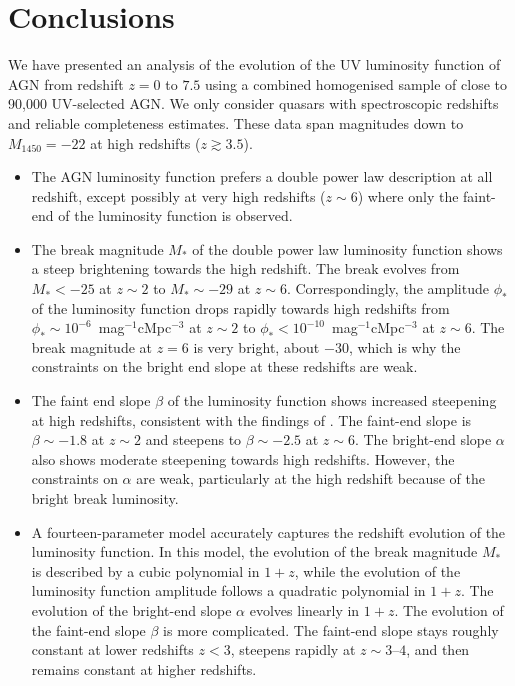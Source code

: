 \documentclass[a4paper,fleqn,usenatbib]{mnras}
\begin{document}
\section{Conclusions}

We have presented an analysis of the evolution of the UV luminosity
function of AGN from redshift $z=0$ to $7.5$ using a combined
homogenised sample of close to 90,000 UV-selected AGN.  We only
consider quasars with spectroscopic redshifts and reliable
completeness estimates.  These data span magnitudes down to
$M_{1450}=-22$ at high redshifts ($z\gtrsim 3.5$).

\begin{itemize}
\item The AGN luminosity function prefers a double power law
  description at all redshift, except possibly at very high redshifts
  ($z\sim 6$) where only the faint-end of the luminosity function is
  observed.

\item The break magnitude $M_*$ of the double power law luminosity
  function shows a steep brightening towards the high redshift.  The
  break evolves from $M_*<-25$ at $z\sim 2$ to $M_*\sim -29$ at $z\sim
  6$.  Correspondingly, the amplitude $\phi_*$ of the luminosity
  function drops rapidly towards high redshifts from $\phi_*\sim
  10^{-6}$~mag$^{-1}$cMpc$^{-3}$ at $z\sim 2$ to $\phi_*<
  10^{-10}$~mag$^{-1}$cMpc$^{-3}$ at $z\sim 6$.  The break magnitude
  at $z=6$ is very bright, about $-30$, which is why the constraints
  on the bright end slope at these redshifts are weak.

\item The faint end slope $\beta$ of the luminosity function shows
  increased steepening at high redshifts, consistent with the findings
  of \citep{2015AA...578A..83G}.  The faint-end slope is $\beta\sim
  -1.8$ at $z\sim 2$ and steepens to $\beta\sim-2.5$ at $z\sim 6$.
  The bright-end slope $\alpha$ also shows moderate steepening towards
  high redshifts.  However, the constraints on $\alpha$ are weak,
  particularly at the high redshift because of the bright break
  luminosity.

\item A fourteen-parameter model accurately captures the redshift
  evolution of the luminosity function.  In this model, the evolution
  of the break magnitude $M_*$ is described by a cubic polynomial in
  $1+z$, while the evolution of the luminosity function amplitude
  follows a quadratic polynomial in $1+z$.  The evolution of the
  bright-end slope $\alpha$ evolves linearly in $1+z$.  The evolution
  of the faint-end slope $\beta$ is more complicated.  The faint-end
  slope stays roughly constant at lower redshifts $z<3$, steepens
  rapidly at $z\sim 3$--$4$, and then remains constant at higher
  redshifts.


\end{itemize}
\end{document}
